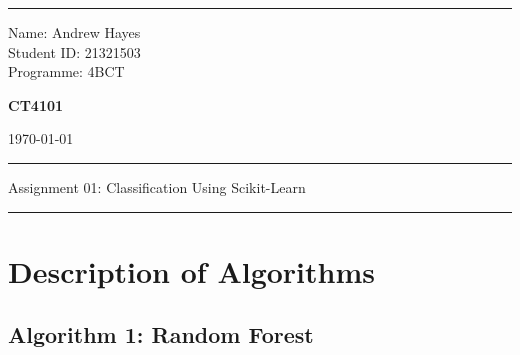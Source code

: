 \documentclass[a4paper]{article}
\begin{document}
\hrule \medskip
\begin{minipage}{0.295\textwidth} 
    \vfill
    \raggedright
    \footnotesize 
    Name: Andrew Hayes \\
    Student ID: 21321503 \hfill \\
    Programme: 4BCT \hfill
    \vfill
\end{minipage}
\begin{minipage}{0.4\textwidth} 
    \centering 
    \Large 
    \vfill
    \textbf{CT4101}
    \vfill
\end{minipage}
\begin{minipage}{0.295\textwidth} 
    \raggedleft
    \vfill
    \today
    \vfill
\end{minipage}
\smallskip
\hrule 
\begin{center}
    \normalsize
    Assignment 01: Classification Using Scikit-Learn
\end{center}
\hrule

\section{Description of Algorithms}
\subsection{Algorithm 1: Random Forest}
\end{document}

